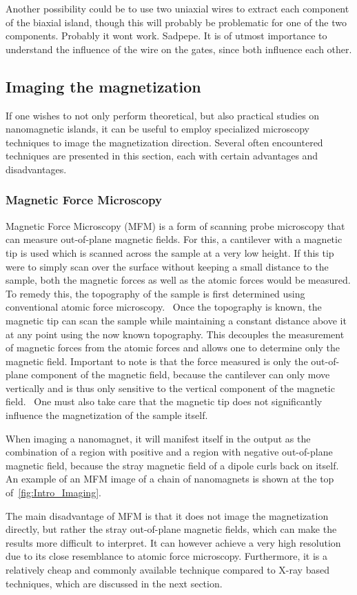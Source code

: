 \documentclass[11pt,a4paper,english]{article}
\begin{document}
Another possibility could be to use two uniaxial wires to extract each component of the biaxial island, though this will probably be problematic for one of the two components. Probably it wont work. Sadpepe.
It is of utmost importance to understand the influence of the wire on the gates, since both influence each other.

\FloatBarrier
\subsection{Imaging the magnetization}
If one wishes to not only perform theoretical, but also practical studies on nanomagnetic islands, it can be useful to employ specialized microscopy techniques to image the magnetization direction. Several often encountered techniques are presented in this section, each with certain advantages and disadvantages.

\subsubsection{Magnetic Force Microscopy}
Magnetic Force Microscopy (MFM) is a form of scanning probe microscopy that can measure out-of-plane magnetic fields. For this, a cantilever with a magnetic tip is used which is scanned across the sample at a very low height. If this tip were to simply scan over the surface without keeping a small distance to the sample, both the magnetic forces as well as the atomic forces would be measured. To remedy this, the topography of the sample is first determined using conventional atomic force microscopy.~\cite{NML_Carlton, PEEM} Once the topography is known, the magnetic tip can scan the sample while maintaining a constant distance above it at any point using the now known topography. This decouples the measurement of magnetic forces from the atomic forces and allows one to determine only the magnetic field. Important to note is that the force measured is only the out-of-plane component of the magnetic field, because the cantilever can only move vertically and is thus only sensitive to the vertical component of the magnetic field.~\cite{NML_Carlton} One must also take care that the magnetic tip does not significantly influence the magnetization of the sample itself.~\cite{Probing_MagnetoOptics} \par
When imaging a nanomagnet, it will manifest itself in the output as the combination of a region with positive and a region with negative out-of-plane magnetic field, because the stray magnetic field of a dipole curls back on itself.~\cite{NML_Carlton} An example of an MFM image of a chain of nanomagnets is shown at the top of~\cref{fig:Intro_Imaging}. \par
The main disadvantage of MFM is that it does not image the magnetization directly, but rather the stray out-of-plane magnetic fields, which can make the results more difficult to interpret. It can however achieve a very high resolution due to its close resemblance to atomic force microscopy. Furthermore, it is a relatively cheap and commonly available technique compared to X-ray based techniques, which are discussed in the next section.
\end{document}
